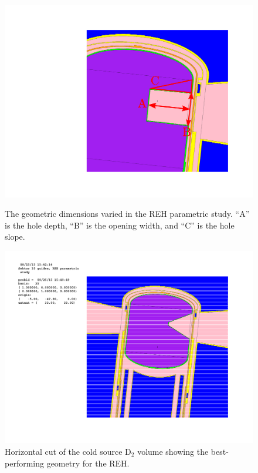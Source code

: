 \documentclass[a4paper]{jpconf}
\begin{document}
\begin{figure}[h]
\begin{minipage}{14pc}
\begin{center}
\includegraphics[scale=0.4,trim={13cm 6cm 4cm 5cm},clip]{graphics/para_geom.pdf}
\end{center}
\caption{\label{parametric_geom}The geometric dimensions varied in the REH parametric study. ``A'' is the hole depth, ``B'' is the opening width, and ``C'' is the hole slope.}
\end{minipage}\hfill%
\begin{minipage}{11pc}
\begin{center}
\includegraphics[scale=0.4,trim={11.2cm 8cm 5cm 3cm},clip]{graphics/case077.pdf}
\end{center}
\caption{\label{case077}Horizontal cut of the cold source D$_2$ volume showing the best-performing geometry for the REH.}
\end{minipage} 
\end{figure}
\end{document}

